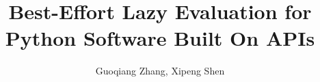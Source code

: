 \documentclass[sigconf]{acmart}\settopmatter{printfolios=true,printccs=false,printacmref=false}\setcopyright{none}
\begin{document}
\title[Best-Effort Lazy Evaluation]{Best-Effort Lazy Evaluation for Python Software Built On APIs}

\author{Guoqiang Zhang, Xipeng Shen}








\renewcommand{\shortauthors}{G. Zhang and X. Shen}
\end{document}
